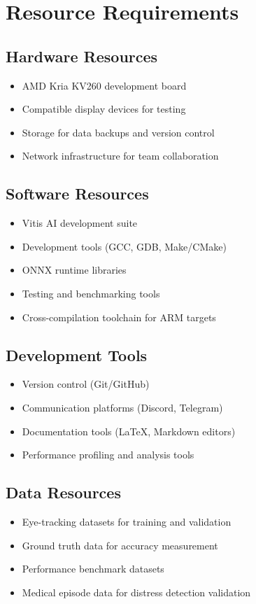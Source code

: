 \section{Resource Requirements}\label{sec:resource-requirements}

\subsection{Hardware Resources}
\begin{itemize}
\item AMD Kria KV260 development board~\cite{xilinx2022kv260}
\item Compatible display devices for testing
\item Storage for data backups and version control
\item Network infrastructure for team collaboration
\end{itemize}

\subsection{Software Resources}
\begin{itemize}
\item Vitis AI development suite
\item Development tools (GCC, GDB, Make/CMake)
\item ONNX runtime libraries
\item Testing and benchmarking tools
\item Cross-compilation toolchain for ARM targets
\end{itemize}

\subsection{Development Tools}
\begin{itemize}
\item Version control (Git/GitHub)
\item Communication platforms (Discord, Telegram)
\item Documentation tools (LaTeX, Markdown editors)
\item Performance profiling and analysis tools
\end{itemize}

\subsection{Data Resources}
\begin{itemize}
\item Eye-tracking datasets for training and validation
\item Ground truth data for accuracy measurement
\item Performance benchmark datasets
\item Medical episode data for distress detection validation
\end{itemize}
